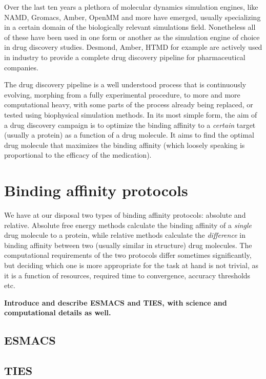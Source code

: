 Over the last ten years a plethora of molecular dynamics simulation engines, like NAMD, Gromacs, Amber, OpenMM and more have emerged, usually specializing in a certain domain of the biologically relevant simulations field. Nonetheless all of these have been used in one form or another as the simulation engine of choice in drug discovery studies. Desmond, Amber, HTMD for example are actively used in industry to provide a complete drug discovery pipeline for pharmaceutical companies. 

The drug discovery pipeline is a well understood process that is continuously evolving, morphing from a fully experimental procedure, to more and more computational heavy, with some parts of the process already being replaced, or tested using biophysical simulation methods. In its most simple form, the aim of a drug discovery campaign is to optimize the binding affinity to a \emph{certain} target (usually a protein) as a function of a drug molecule. It aims to find the optimal drug molecule that maximizes the binding affinity (which loosely speaking is proportional to the efficacy of the medication). 

\section{Binding affinity protocols}

We have at our disposal two types of binding affinity protocols: absolute and relative. Absolute free energy methods calculate the binding affinity of a \emph{single} drug molecule to a protein, while relative methods calculate the \emph{difference} in binding affinity between two (usually similar in structure) drug molecules. The computational requirements of the two protocols differ sometimes significantly, but deciding which one is more appropriate for the task at hand is not trivial, as it is a function of resources, required time to convergence, accuracy thresholds etc.

\textbf{Introduce and describe ESMACS and TIES, with science and computational details as well.}

\subsection{ESMACS}

\subsection{TIES}


